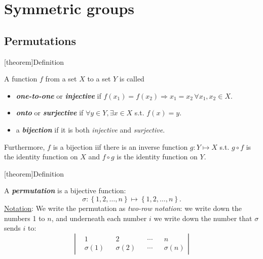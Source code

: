 \documentclass[12pt]{report}
\theoremstyle{definition}
\begin{document}
\section{Symmetric groups}

\subsection{Permutations}

[theorem]{Definition}
\begin{function classification}
    A function $f$ from a set $X$ to a set $Y$ is called
    \begin{itemize}
            \item \textbf{\emph{one-to-one}} or \textbf{\emph{injective}} 
                if $f(x_1) = f(x_2) \Rightarrow{}x_1 = x_2 \,\forall x_1, x_2 \in{}X$.
                
            \item \textbf{\emph{onto}} or \textbf{\emph{surjective}} if
                $\forall y \in{}Y, \exists x \in{}X$ s.t. $f(x) = y$.

            \item a \textbf{\emph{bijection}} if it is both \emph{injective} and \emph{surjective}.
    \end{itemize}
\end{function classification}

Furthermore, $f$ is a bijection iif there is an inverse function $g: Y \mapsto X$
s.t. $g \circ f$ is the identity function on $X$ and $f \circ g$ is the identity function on $Y$.


[theorem]{Definition}
\begin{permutation}
    A \textbf{\emph{permutation}} is a bijective function:\[
        \sigma : \left\{1, 2, \ldots, n\right\} \mapsto \left\{1, 2, \ldots, n\right\}.
    \]
    \underline{Notation}: We write the permutation as \emph{two-row notation}:
    we write down the numbers 1 to $n$, and underneath each number $i$
    we write down the number that $\sigma$ sends $i$ to:\[
        \left|
        \begin{align*}
            & 1 && 2 && \cdots && n \\
            & \sigma(1) && \sigma(2) && \cdots && \sigma(n)
        \end{align*}
        \right| 
    \]
\end{permutation}
\end{document}
